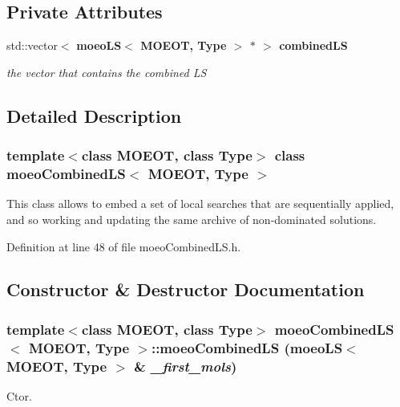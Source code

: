 \subsection*{Private Attributes}
\begin{CompactItemize}
\item 
std::vector$<$ \bf{moeo\-LS}$<$ MOEOT, Type $>$ $\ast$ $>$ \bf{combined\-LS}\label{classmoeoCombinedLS_3cf36ae7ada10d2837b60df01210d92a}

\begin{CompactList}\small\item\em the vector that contains the combined LS \item\end{CompactList}\end{CompactItemize}


\subsection{Detailed Description}
\subsubsection*{template$<$class MOEOT, class Type$>$ class moeo\-Combined\-LS$<$ MOEOT, Type $>$}

This class allows to embed a set of local searches that are sequentially applied, and so working and updating the same archive of non-dominated solutions. 



Definition at line 48 of file moeo\-Combined\-LS.h.

\subsection{Constructor \& Destructor Documentation}
\subsubsection{\setlength{\rightskip}{0pt plus 5cm}template$<$class MOEOT, class Type$>$ \bf{moeo\-Combined\-LS}$<$ MOEOT, Type $>$::\bf{moeo\-Combined\-LS} (\bf{moeo\-LS}$<$ MOEOT, Type $>$ \& {\em \_\-first\_\-mols})\hspace{0.3cm}{\tt  [inline]}}\label{classmoeoCombinedLS_5d09220b47bac67bd332dc0f93226ae1}


Ctor. 

